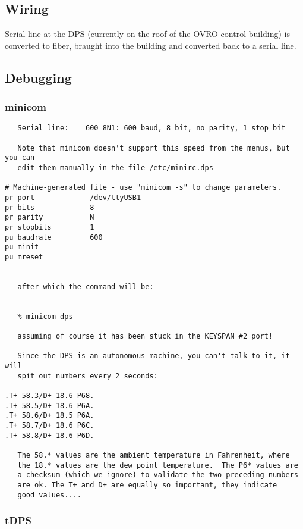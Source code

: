 \documentclass[11pt]{article}
\begin{document}
\subsection{Wiring}

Serial line at the DPS (currently on the roof of the 
OVRO control building) is converted to fiber, braught
into the building and converted back to a serial line.

\subsection{Debugging}


\subsubsection{minicom}

\footnotesize
\begin{verbatim}
   Serial line:    600 8N1: 600 baud, 8 bit, no parity, 1 stop bit

   Note that minicom doesn't support this speed from the menus, but you can
   edit them manually in the file /etc/minirc.dps

# Machine-generated file - use "minicom -s" to change parameters.
pr port             /dev/ttyUSB1
pr bits             8
pr parity           N
pr stopbits         1
pu baudrate         600
pu minit            
pu mreset           


   after which the command will be:


   % minicom dps

   assuming of course it has been stuck in the KEYSPAN #2 port!

   Since the DPS is an autonomous machine, you can't talk to it, it will
   spit out numbers every 2 seconds:

.T+ 58.3/D+ 18.6 P68.
.T+ 58.5/D+ 18.6 P6A.
.T+ 58.6/D+ 18.5 P6A.
.T+ 58.7/D+ 18.6 P6C.
.T+ 58.8/D+ 18.6 P6D.

   The 58.* values are the ambient temperature in Fahrenheit, where 
   the 18.* values are the dew point temperature.  The P6* values are
   a checksum (which we ignore) to validate the two preceding numbers 
   are ok. The T+ and D+ are equally so important, they indicate
   good values....

\end{verbatim}
\footnotesize

\subsubsection{tDPS}
\end{document}
